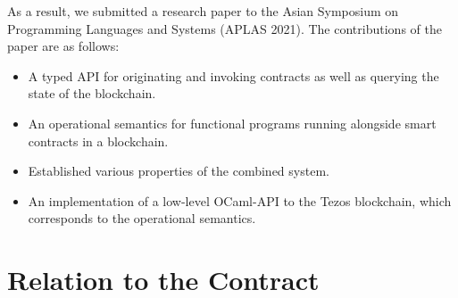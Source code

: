 \documentclass[a4paper,11pt]{article}
\begin{document}
\begin{itemize}
As a result, we submitted a research paper to the Asian Symposium on Programming Languages and Systems (APLAS 2021). The contributions of the paper are as follows:
\begin{itemize}
\item A typed API for originating and invoking contracts as well as querying the
state of the blockchain.
\item An operational semantics for functional programs running alongside smart
contracts in a blockchain.
\item Established various properties of the combined system.
\item An implementation of a low-level OCaml-API to the Tezos blockchain, which corresponds to the operational semantics. 
\end{itemize}
\end{itemize}

\section{Relation to the Contract}
\label{sec:relation-contract}
\end{document}
